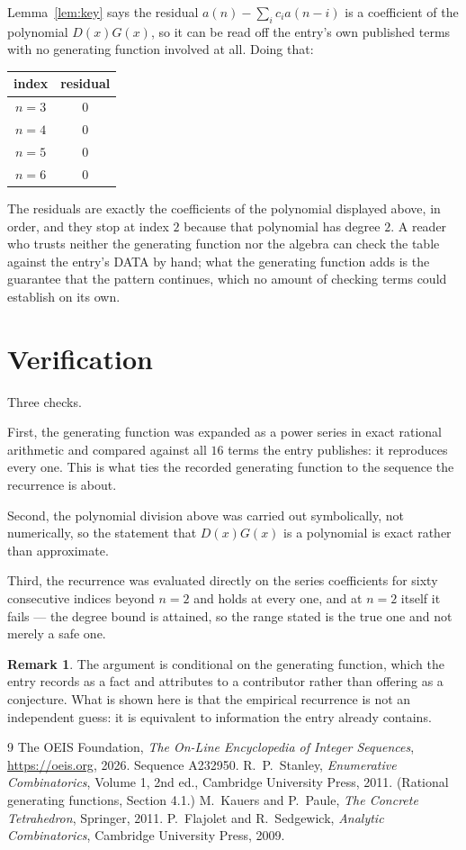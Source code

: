 \documentclass[11pt,a4paper]{article}
\theoremstyle{plain}
\theoremstyle{definition}
\newtheorem{remark}[theorem]{Remark}
\begin{document}
Lemma~\ref{lem:key} says the residual $a(n)-\sum_ic_ia(n-i)$ is a coefficient of the
polynomial $D(x)G(x)$, so it can be read off the entry's own published terms with no
generating function involved at all. Doing that:
\begin{center}
\begin{tabular}{cc}
index & residual \\ \hline
$n=3$ & $0$ \\
$n=4$ & $0$ \\
$n=5$ & $0$ \\
$n=6$ & $0$
\end{tabular}
\end{center}
The residuals are exactly the coefficients of the polynomial displayed above, in order, and
they stop at index $2$ because that polynomial has degree $2$. A reader who trusts
neither the generating function nor the algebra can check the table against the entry's DATA
by hand; what the generating function adds is the guarantee that the pattern continues, which
no amount of checking terms could establish on its own.

\section{Verification}

Three checks.

First, the generating function was expanded as a power series in exact rational arithmetic and
compared against all $16$ terms the entry publishes: it reproduces every one. This is
what ties the recorded generating function to the sequence the recurrence is about.

Second, the polynomial division above was carried out symbolically, not numerically, so the
statement that $D(x)G(x)$ is a polynomial is exact rather than approximate.

Third, the recurrence was evaluated directly on the series coefficients for sixty consecutive
indices beyond $n=2$ and holds at every one, and at $n=2$ itself it fails --- the
degree bound is attained, so the range stated is the true one and not merely a safe one.

\begin{remark}
The argument is conditional on the generating function, which the entry records as a fact and
attributes to a contributor rather than offering as a conjecture. What is shown here is that
the empirical recurrence is not an independent guess: it is equivalent to information the
entry already contains.
\end{remark}

\begin{thebibliography}{9}
 The OEIS Foundation, \emph{The On-Line Encyclopedia of Integer
Sequences}, \url{https://oeis.org}, 2026. Sequence A232950.
 R.~P.~Stanley, \emph{Enumerative Combinatorics}, Volume 1, 2nd ed.,
Cambridge University Press, 2011. (Rational generating functions, Section 4.1.)
 M.~Kauers and P.~Paule, \emph{The Concrete Tetrahedron}, Springer, 2011.
 P.~Flajolet and R.~Sedgewick, \emph{Analytic Combinatorics}, Cambridge
University Press, 2009.
\end{thebibliography}
\end{document}
